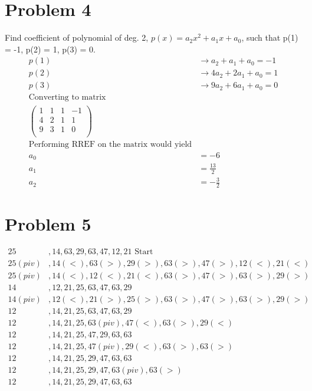 \documentclass{article}
\begin{document}
\section*{Problem 4}
Find coefficient of polynomial of deg. 2, \(p(x) = a_2x^2+a_1x+a_0\), such that p(1) = -1, p(2) = 1, p(3) = 0.
\begin{align*}
p(1) &\rightarrow a_2 + a_1 + a_0 = -1 \\
p(2) &\rightarrow 4a_2 + 2a_1 + a_0 = 1 \\
p(3) &\rightarrow 9a_2 + 6a_1 + a_0 = 0 \\
\text{Converting to matrix} \\
\begin{pmatrix}
1 & 1 & 1 & -1 \\
4 & 2 & 1 & 1 \\
9 & 3 & 1 & 0 \\
\end{pmatrix} \\
\text{Performing RREF on the matrix would yield} \\
a_0 &= -6 \\
a_1 &= \frac{13}{2} \\
a_2 &= -\frac{3}{2}
\end{align*}
\section*{Problem 5}
\begin{align}
25&, 14, 63, 29, 63, 47, 12, 21 \text{ Start} \\
25 (piv) &, 14 (<), 63 (>), 29 (>), 63 (>), 47 (>), 12 (<), 21 (<) \\
25 (piv) &, 14 (<), 12 (<), 21 (<), 63 (>), 47 (>), 63 (>), 29 (>) \\
14 &, 12, 21, 25, 63, 47, 63, 29 \\
14 (piv) &, 12 (<), 21 (>), 25 (>), 63 (>), 47 (>), 63 (>), 29 (>) \\
12 &, 14, 21, 25, 63, 47, 63, 29 \\
12 &, 14, 21, 25, 63 (piv), 47 (<), 63 (>), 29 (<) \\
12 &, 14, 21, 25, 47, 29, 63, 63 \\
12 &, 14, 21, 25, 47 (piv), 29 (<), 63 (>), 63 (>) \\
12 &, 14, 21, 25, 29, 47, 63, 63 \\
12 &, 14, 21, 25, 29, 47, 63 (piv), 63 (>) \\
12 &, 14, 21, 25, 29, 47, 63, 63
\end{align}
\end{document}
